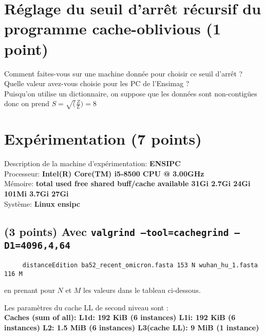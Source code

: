 \documentclass[10pt,a4paper]{article}
\begin{document}
\section{Réglage du seuil d'arrêt récursif du programme cache-oblivious (1 point)}
Comment faites-vous sur une machine donnée pour choisir ce seuil d'arrêt ? Quelle valeur avez-vous choisie pour les PC de l'Ensimag ? \\
Puisqu'on utilise un dictionnaire, on suppose que les données sont non-contigües donc on prend $ S = \sqrt(\frac{Z}{L}) = 8 $

\section{Expérimentation (7 points)}

Description de la machine d'expérimentation: \textbf{ENSIPC}\\
Processeur: \textbf{Intel(R) Core(TM) i5-8500 CPU @ 3.00GHz}\\
Mémoire: \textbf{total        used        free      shared  buff/cache   available
          31Gi       2.7Gi        24Gi       101Mi       3.7Gi        27Gi}\\
Système: \textbf{Linux ensipc}\\

\subsection{(3 points) Avec {\tt valgrind --tool=cachegrind --D1=4096,4,64}}
\begin{verbatim}
     distanceEdition ba52_recent_omicron.fasta 153 N wuhan_hu_1.fasta 116 M
\end{verbatim}
en prenant pour $N$ et $M$ les valeurs dans le tableau ci-dessous.

Les paramètres du cache LL de second niveau sont :\\ \textbf{Caches (sum of all):     
L1d:                   192 KiB (6 instances)
L1i:                   192 KiB (6 instances)
L2:                    1.5 MiB (6 instances)
L3(cache LL):          9 MiB (1 instance)
}
\end{document}
